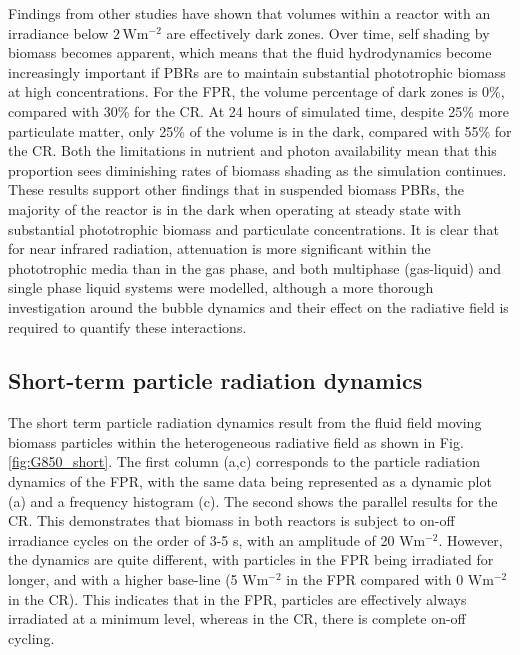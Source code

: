 Findings from other studies \cite{kong2014} have shown that volumes within a reactor with an irradiance below $\mathrm{2\, Wm^{-2}}$ are effectively dark zones. Over time, self shading by biomass becomes apparent, which means that the fluid hydrodynamics become increasingly important if PBRs are to maintain substantial phototrophic biomass at high concentrations. For the FPR, the volume percentage of dark zones is 0\%, compared with 30\% for the CR. At 24 hours of simulated time, despite  25\% more particulate matter, only 25\% of the volume is in the dark, compared with 55\% for the CR. Both the limitations in nutrient and photon availability mean that this proportion sees diminishing rates of biomass shading as the simulation continues. These results support other findings that in suspended biomass PBRs, the majority of the reactor is in the dark when operating at steady state with substantial phototrophic biomass and particulate concentrations. It is clear that for near infrared radiation, attenuation is more significant within the phototrophic media than in the gas phase, and both multiphase (gas-liquid) and single phase liquid systems were modelled, although a more thorough investigation around the bubble dynamics and their effect on the radiative field is required to quantify these interactions.

\subsection{Short-term particle radiation dynamics}
\label{ssec:strf}
The short term particle radiation dynamics result from the fluid field moving biomass particles within the heterogeneous radiative field as shown in Fig. \ref{fig:G850_short}. The first column (a,c) corresponds to the particle radiation dynamics of the FPR, with the same data being represented as a dynamic plot (a) and a frequency histogram (c). The second shows the parallel results for the CR. This demonstrates that biomass in both reactors is subject to on-off irradiance cycles on the order of 3-5 s, with an amplitude of 20 $\mathrm{W m^{-2}}$. However, the dynamics are quite different, with particles in the FPR being irradiated for longer, and with a higher base-line (5 $\mathrm{W m^{-2}}$ in the FPR compared with 0 $\mathrm{W m^{-2}}$ in the CR). This indicates that in the FPR, particles are effectively always irradiated at a minimum level, whereas in the CR,  there is complete on-off cycling. 

